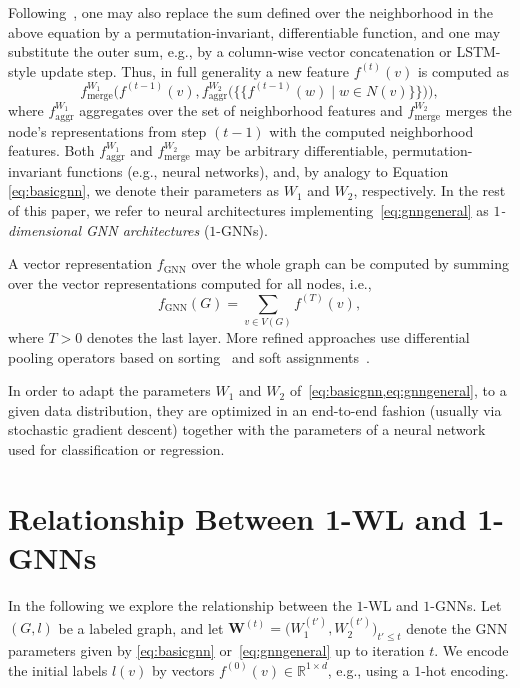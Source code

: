 \documentclass[letterpaper]{article}
\theoremstyle{definition}
\newcommand{\RR}{\mathbb{R}}
\newcommand{\oms}{\{\!\!\{}
\newcommand{\cms}{\}\!\!\}}
\begin{document}
Following~\cite{Gil+2017}, one may also replace the sum defined over the neighborhood in the above equation by a permutation-invariant, differentiable function, and one may substitute the outer sum, e.g., by a column-wise vector concatenation or LSTM-style update step.
Thus, in full generality a new feature $f^{(t)}(v)$ is computed as
\begin{equation}\label{eq:gnngeneral}
	f^{W_1}_{\text{merge}}\Big(f^{(t-1)}(v) ,f^{W_2}_{\text{aggr}}\big(\oms f^{(t-1)}(w) \mid  w \in N(v)\cms \big)\!\Big),
\end{equation}
where $f^{W_1}_{\text{aggr}}$ aggregates over the set of neighborhood features and $f^{W_2}_{\text{merge}}$ merges the node's representations from step $(t-1)$ with the computed neighborhood features.
Both $f^{W_1}_{\text{aggr}}$ and $f^{W_2}_{\text{merge}}$ may be arbitrary differentiable, permutation-invariant functions (e.g., neural networks), and, by analogy to Equation \ref{eq:basicgnn}, we denote their parameters as $W_1$ and $W_2$, respectively. 
In the rest of this paper, we refer to neural architectures implementing~\cref{eq:gnngeneral} as \emph{$1$-dimensional GNN architectures} ($1$-GNNs).

A vector representation $f_{\text{GNN}}$ over the whole graph can be computed by summing over the vector representations computed for all nodes, i.e.,  
\begin{equation*}
	f_{\text{GNN}}(G) = \sum_{v \in V(G)} f^{(T)}(v),
\end{equation*}
where $T > 0$ denotes the last layer. More refined approaches use differential pooling operators based on sorting~\cite{Zha+2018} and soft assignments~\cite{Yin+2018}. 

In order to adapt the parameters $W_1$ and $W_2$ of~\cref{eq:basicgnn,eq:gnngeneral}, to a given data distribution, they are optimized in an end-to-end  fashion (usually via stochastic gradient descent) together with the parameters of a neural network used for classification or regression.

\section{Relationship Between 1-WL and 1-GNNs}

In the following we explore the relationship between the $1$-WL and $1$-GNNs. 
Let $(G,l)$ be a labeled graph, and let $\mathbf{W}^{(t)} = \big(W^{(t')}_1, W^{(t')}_2 \big)_{t'\leq t}$ denote the GNN parameters given by \cref{eq:basicgnn} or~\cref{eq:gnngeneral} up to iteration $t$. 
We encode the initial labels $l(v)$ by vectors  $f^{(0)}(v)\in\RR^{1\times d}$, e.g., using a $1$-hot encoding. 
\end{document}
